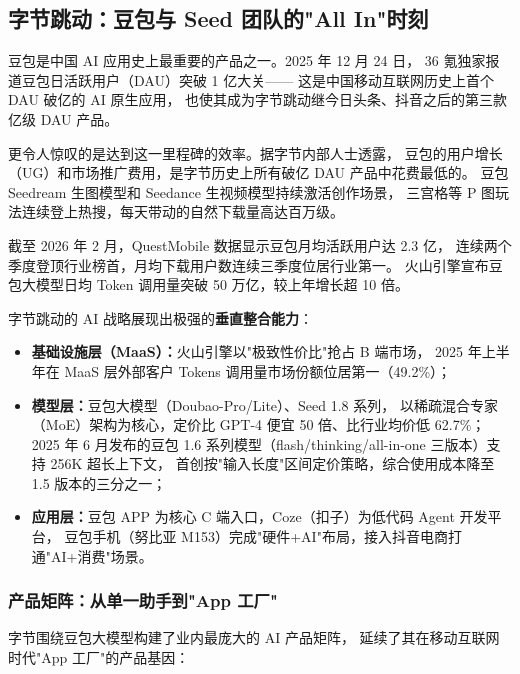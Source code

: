 \subsection{字节跳动：豆包与 Seed 团队的"All In"时刻}
\label{subsec:china-bytedance}

豆包是中国 AI 应用史上最重要的产品之一。2025 年 12 月 24 日，
36 氪独家报道豆包日活跃用户（DAU）突破 1 亿大关——
这是中国移动互联网历史上首个 DAU 破亿的 AI 原生应用，
也使其成为字节跳动继今日头条、抖音之后的第三款亿级 DAU 产品。

更令人惊叹的是达到这一里程碑的效率。据字节内部人士透露，
豆包的用户增长（UG）和市场推广费用，是字节历史上所有破亿 DAU 产品中花费最低的。
豆包 Seedream 生图模型和 Seedance 生视频模型持续激活创作场景，
三宫格等 P 图玩法连续登上热搜，每天带动的自然下载量高达百万级。

截至 2026 年 2 月，QuestMobile 数据显示豆包月均活跃用户达 2.3 亿，
连续两个季度登顶行业榜首，月均下载用户数连续三季度位居行业第一。
火山引擎宣布豆包大模型日均 Token 调用量突破 50 万亿，较上年增长超 10 倍。

字节跳动的 AI 战略展现出极强的\textbf{垂直整合能力}：

\begin{itemize}
  \item \textbf{基础设施层（MaaS）：}火山引擎以"极致性价比"抢占 B 端市场，
    2025 年上半年在 MaaS 层外部客户 Tokens 调用量市场份额位居第一（49.2\%）；
  \item \textbf{模型层：}豆包大模型（Doubao-Pro/Lite）、Seed 1.8 系列，
    以稀疏混合专家（MoE）架构为核心，定价比 GPT-4 便宜 50 倍、比行业均价低 62.7\%；
    2025 年 6 月发布的豆包 1.6 系列模型（flash/thinking/all-in-one 三版本）支持 256K 超长上下文，
    首创按"输入长度"区间定价策略，综合使用成本降至 1.5 版本的三分之一；
  \item \textbf{应用层：}豆包 APP 为核心 C 端入口，Coze（扣子）为低代码 Agent 开发平台，
    豆包手机（努比亚 M153）完成"硬件+AI"布局，接入抖音电商打通"AI+消费"场景。
\end{itemize}

\subsubsection{产品矩阵：从单一助手到"App 工厂"}

字节围绕豆包大模型构建了业内最庞大的 AI 产品矩阵，
延续了其在移动互联网时代"App 工厂"的产品基因：

